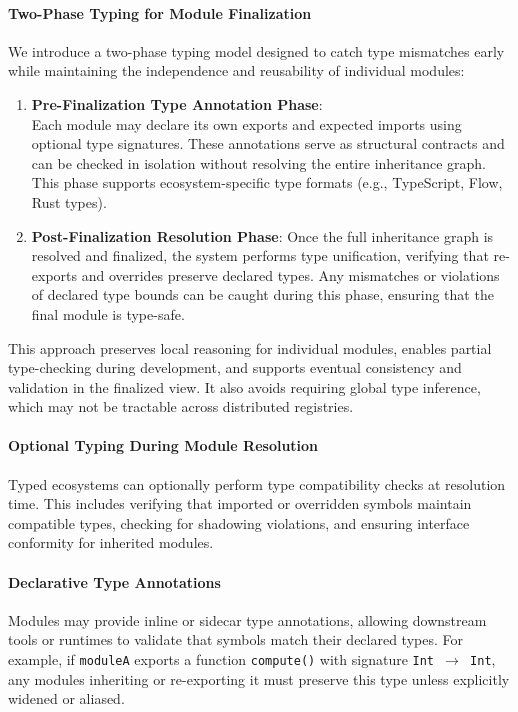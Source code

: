\documentclass[sigplan,screen]{acmart}
\begin{document}
\paragraph{Two-Phase Typing for Module Finalization}
We introduce a two-phase typing model designed to catch type mismatches early while maintaining the independence and reusability of individual modules:

\begin{enumerate}
  \item \textbf{Pre-Finalization Type Annotation Phase}: \\Each module may declare its own exports and expected imports using optional type signatures. These annotations serve as structural contracts and can be checked in isolation without resolving the entire inheritance graph. This phase supports ecosystem-specific type formats (e.g., TypeScript, Flow, Rust types).
  
  \item \textbf{Post-Finalization Resolution Phase}: Once the full inheritance graph is resolved and finalized, the system performs type unification, verifying that re-exports and overrides preserve declared types. Any mismatches or violations of declared type bounds can be caught during this phase, ensuring that the final module is type-safe.
\end{enumerate}

This approach preserves local reasoning for individual modules, enables partial type-checking during development, and supports eventual consistency and validation in the finalized view. It also avoids requiring global type inference, which may not be tractable across distributed registries.

\paragraph{Optional Typing During Module Resolution}
Typ\-ed ecosystems can optionally perform type compatibility checks at resolution time. This includes verifying that imported or overridden symbols maintain compatible types, checking for shadowing violations, and ensuring interface conformity for inherited modules.

\paragraph{Declarative Type Annotations}
Modules may provide inline or sidecar type annotations, allowing downstream tools or runtimes to validate that symbols match their declared types. For example, if \texttt{moduleA} exports a function \texttt{compute()} with signature \texttt{Int $\to$ Int}, any modules inheriting or re-exporting it must preserve this type unless explicitly widened or aliased.
\end{document}
